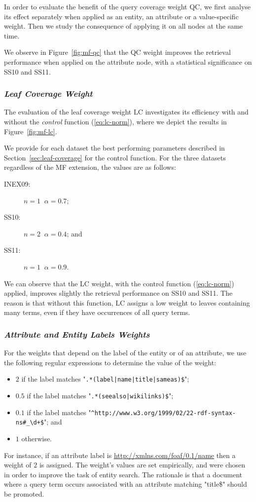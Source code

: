 In order to evaluate the benefit of the query coverage weight QC, we first analyse its effect separately when applied as an entity, an attribute or a value-specific weight. Then we study the consequence of applying it on all nodes at the same time.

We observe in Figure~\ref{fig:mf-qc} that the QC weight improves the retrieval performance when applied on the attribute node, with a statistical significance on SS10 and SS11.

\subsubsection{\emph{Leaf Coverage Weight}}
\label{sec:lc-weight-effect}

The evaluation of the leaf coverage weight LC investigates its efficiency with and without the \emph{control} function (\ref{eq:lc-norm}), where we depict the results in Figure~\ref{fig:mf-lc}.

We provide for each dataset the best performing parameters described in Section~\ref{sec:leaf-coverage} for the control function. For the three datasets regardless of the \gls{MF} extension, the values are as follows:
\begin{description}
	\item[INEX09:] $n=1\;\;\alpha=0.7$;
	\item[SS10:] $n=2\;\;\alpha=0.4$; and
	\item[SS11:] $n=1\;\;\alpha=0.9$.
\end{description}
We can observe that the LC weight, with the control function (\ref{eq:lc-norm}) applied, improves slightly the retrieval performance on SS10 and SS11. The reason is that without this function, LC assigns a low weight to leaves containing many terms, even if they have occurrences of all query terms.

\subsubsection{\emph{Attribute and Entity Labels Weights}}
\label{sec:ael-weight-effect}

For the weights that depend on the label of the entity or of an attribute, we use the following regular expressions to determine the value of the weight:
\begin{itemize}
	\item $2$ if the label matches "\verb/.*(label|name|title|sameas)$/";
	\item $0.5$ if the label matches "\verb/.*(seealso|wikilinks)$/";
	\item $0.1$ if the label matches "\verb|^http://www.w3.org/1999/02/22-rdf-syntax-ns#_\d+$|"; and
	\item $1$ otherwise.
\end{itemize}
For instance, if an attribute label is \url{http://xmlns.com/foaf/0.1/name} then a weight of $2$ is assigned. The weight's values are set empirically, and were chosen in order to improve the task of entity search. The rationale is that a document where a query term occurs associated with an attribute matching "title\$" should be promoted.


